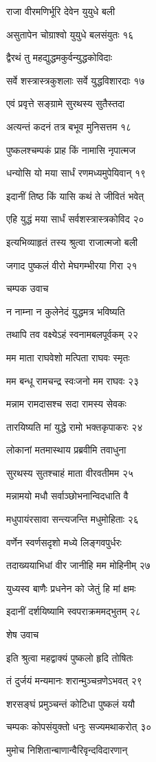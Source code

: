 राजा वीरमणिर्भूरि देवेन युयुधे बली

असुतापेन चोग्राश्वो युयुधे बलसंयुतः १६

द्वैरथं तु महद्युद्धमकुर्वन्युद्धकोविदाः

सर्वे शस्त्रास्त्रकुशलाः सर्वे युद्धविशारदाः १७

एवं प्रवृत्ते सङ्ग्रामे सुरथस्य सुतैस्तदा

अत्यन्तं कदनं तत्र बभूव मुनिसत्तम १८

पुष्कलश्चम्पकं प्राह किं नामासि नृपात्मज

धन्योसि यो मया सार्धं रणमध्यमुपेयिवान् १९

इदानीं तिष्ठ किं यासि कथं ते जीवितं भवेत्

एहि युद्धं मया सार्धं सर्वशस्त्रास्त्रकोविद २०

इत्यभिव्याहृतं तस्य श्रुत्वा राजात्मजो बली

जगाद पुष्कलं वीरो मेघगम्भीरया गिरा २१

चम्पक उवाच

न नाम्ना न कुलेनेदं युद्धमत्र भविष्यति

तथापि तव वक्ष्येऽहं स्वनामबलपूर्वकम् २२

मम माता राघवेशो मत्पिता राघवः स्मृतः

मम बन्धू रामचन्द्र स्वःजनो मम राघवः २३

मन्नाम रामदासश्च सदा रामस्य सेवकः

तारयिष्यति मां युद्धे रामो भक्तकृपाकरः २४

लोकानां मतमास्थाय प्रब्रवीमि तवाधुना

सुरथस्य सुतश्चाहं माता वीरवतीमम २५

मन्नामयो मधौ सर्वाञ्छोभनान्विदधाति वै

मधुपायंरसावा सन्त्यजन्ति मधुमोहिताः २६

वर्णेन स्वर्णसदृशो मध्ये लिङ्गवपुर्धरः

तदाख्ययाभिधां वीर जानीहि मम मोहिनीम् २७

युध्यस्व बाणैः प्रधनेन को जेतुं हि मां क्षमः

इदानीं दर्शयिष्यामि स्वपराक्रममद्भुतम् २८

शेष उवाच

इति श्रुत्वा महद्वाक्यं पुष्कलो हृदि तोषितः

तं दुर्जयं मन्यमानः शरान्मुञ्चन्रणेऽभवत् २९

शरसङ्घं प्रमुञ्चन्तं कोटिधा पुष्कलं ययौ

चम्पकः कोपसंयुक्तो धनुः सज्यमथाकरोत् ३०

मुमोच निशितान्बाणान्वैरिवृन्दविदारणान्

